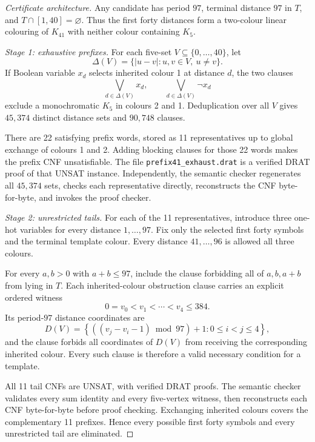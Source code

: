 \documentclass[11pt]{article}
\theoremstyle{definition}
\theoremstyle{remark}
\newcommand{\code}[1]{\texttt{#1}}
\begin{document}
\begin{proof}[Certificate architecture]
Any candidate has period $97$, terminal distance $97$ in $T$, and
$T\cap[1,40]=\varnothing$. Thus the first forty distances form a two-colour
linear colouring of $K_{41}$ with neither colour containing $K_5$.

\emph{Stage 1: exhaustive prefixes.}
For each five-set $V\subseteq\{0,\ldots,40\}$, let
\[
  \Delta(V)=\{|u-v|:u,v\in V,\ u\ne v\}.
\]
If Boolean variable $x_d$ selects inherited colour 1 at distance $d$, the
two clauses
\[
  \bigvee_{d\in\Delta(V)}x_d,\qquad
  \bigvee_{d\in\Delta(V)}\neg x_d
\]
exclude a monochromatic $K_5$ in colours 2 and 1. Deduplication over all
$V$ gives $45{,}374$ distinct distance sets and $90{,}748$ clauses.

There are 22 satisfying prefix words, stored as 11 representatives up to
global exchange of colours 1 and 2. Adding blocking clauses for those 22
words makes the prefix CNF unsatisfiable. The file
\code{prefix41\_exhaust.drat} is a verified DRAT proof of that UNSAT
instance. Independently, the semantic checker regenerates all $45{,}374$
sets, checks each representative directly, reconstructs the CNF
byte-for-byte, and invokes the proof checker.

\emph{Stage 2: unrestricted tails.}
For each of the 11 representatives, introduce three one-hot variables for
every distance $1,\ldots,97$. Fix only the selected first forty symbols and
the terminal template colour. Every distance $41,\ldots,96$ is allowed all
three colours.

For every $a,b>0$ with $a+b\le97$, include the clause forbidding all of
$a,b,a+b$ from lying in $T$. Each inherited-colour obstruction clause
carries an explicit ordered witness
\[
  0=v_0<v_1<\cdots<v_4\le384.
\]
Its period-$97$ distance coordinates are
\[
  D(V)=
  \left\{((v_j-v_i-1)\bmod97)+1:0\le i<j\le4\right\},
\]
and the clause forbids all coordinates of $D(V)$ from receiving the
corresponding inherited colour. Every such clause is therefore a valid
necessary condition for a template.

All 11 tail CNFs are UNSAT, with verified DRAT proofs. The semantic checker
validates every sum identity and every five-vertex witness, then reconstructs
each CNF byte-for-byte before proof checking. Exchanging inherited colours
covers the complementary 11 prefixes. Hence every possible first forty
symbols and every unrestricted tail are eliminated.
\end{proof}
\end{document}

